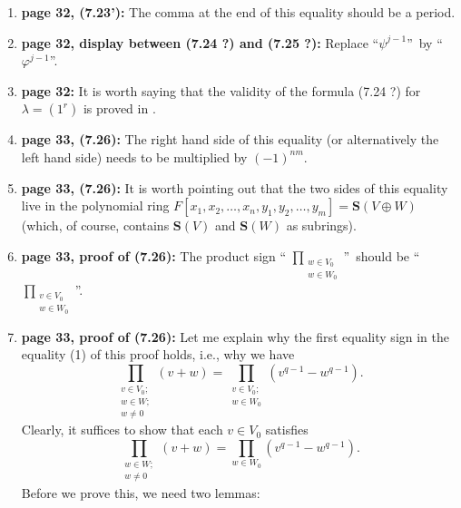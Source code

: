 \documentclass[numbers=enddot,12pt,final,onecolumn,notitlepage]{scrartcl}%
\theoremstyle{definition}
\let\prodnonlimits\prod
\renewcommand{\prod}{\prodnonlimits\limits}
\begin{document}
\begin{enumerate}
\item \textbf{page 32, (7.23'):} The comma at the end of this equality should
be a period.

\item \textbf{page 32, display between (7.24 ?) and (7.25 ?):} Replace
\textquotedblleft$\psi^{j-1}$\textquotedblright\ by \textquotedblleft%
$\varphi^{j-1}$\textquotedblright.

\item \textbf{page 32:} It is worth saying that the validity of the formula
(7.24 ?) for $\lambda=\left(  1^{r}\right)  $ is proved in \cite[\S I.2,
Example 26 (d)]{Macdon95}.

\item \textbf{page 33, (7.26):} The right hand side of this equality (or
alternatively the left hand side) needs to be multiplied by $\left(
-1\right)  ^{nm}$.

\item \textbf{page 33, (7.26):} It is worth pointing out that the two sides of
this equality live in the polynomial ring $F\left[  x_{1},x_{2},\ldots
,x_{n},y_{1},y_{2},\ldots,y_{m}\right]  =\mathbf{S}\left(  V\oplus W\right)  $
(which, of course, contains $\mathbf{S}\left(  V\right)  $ and $\mathbf{S}%
\left(  W\right)  $ as subrings).

\item \textbf{page 33, proof of (7.26):} The product sign \textquotedblleft%
$\prod_{\substack{w\in V_{0}\\w\in W_{0}}}$\textquotedblright\ should be
\textquotedblleft$\prod_{\substack{v\in V_{0}\\w\in W_{0}}}$\textquotedblright.

\item \textbf{page 33, proof of (7.26):} Let me explain why the first equality
sign in the equality (1) of this proof holds, i.e., why we have%
\begin{equation}
\prod_{\substack{v\in V_{0};\\w\in W;\\w\neq0}}\left(  v+w\right)
=\prod_{\substack{v\in V_{0};\\w\in W_{0}}}\left(  v^{q-1}-w^{q-1}\right)  .
\label{p33.7.26.1}%
\end{equation}
Clearly, it suffices to show that each $v\in V_{0}$ satisfies%
\begin{equation}
\prod_{\substack{w\in W;\\w\neq0}}\left(  v+w\right)  =\prod_{w\in W_{0}%
}\left(  v^{q-1}-w^{q-1}\right)  . \label{p33.7.26.2}%
\end{equation}
Before we prove this, we need two lemmas:


\end{enumerate}
\end{document}

